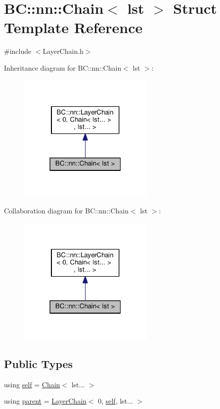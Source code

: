 \hypertarget{structBC_1_1nn_1_1Chain}{}\section{BC\+:\+:nn\+:\+:Chain$<$ lst $>$ Struct Template Reference}
\label{structBC_1_1nn_1_1Chain}


{\ttfamily \#include $<$Layer\+Chain.\+h$>$}



Inheritance diagram for BC\+:\+:nn\+:\+:Chain$<$ lst $>$\+:
\nopagebreak
\begin{figure}[H]
\begin{center}
\leavevmode
\includegraphics[width=187pt]{structBC_1_1nn_1_1Chain__inherit__graph}
\end{center}
\end{figure}


Collaboration diagram for BC\+:\+:nn\+:\+:Chain$<$ lst $>$\+:
\nopagebreak
\begin{figure}[H]
\begin{center}
\leavevmode
\includegraphics[width=187pt]{structBC_1_1nn_1_1Chain__coll__graph}
\end{center}
\end{figure}
\subsection*{Public Types}
\begin{DoxyCompactItemize}
\item 
using \hyperlink{structBC_1_1nn_1_1Chain_a921489965d26e0a38dc0e44d9224ff11}{self} = \hyperlink{structBC_1_1nn_1_1Chain}{Chain}$<$ lst... $>$
\item 
using \hyperlink{structBC_1_1nn_1_1Chain_a61348985f8615b90024f8206bb37c9b5}{parent} = \hyperlink{structBC_1_1nn_1_1LayerChain}{Layer\+Chain}$<$ 0, \hyperlink{structBC_1_1nn_1_1Chain_a921489965d26e0a38dc0e44d9224ff11}{self}, lst... $>$
\end{DoxyCompactItemize}
